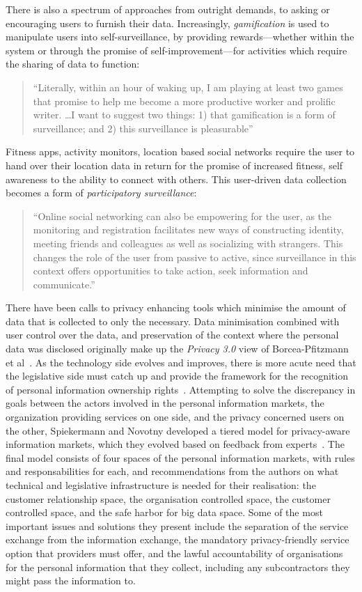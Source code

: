 \documentclass{IOS-Book-Article}     %
\begin{document}
There is also a spectrum of approaches from outright demands, 
to asking or encouraging users to furnish their data.
Increasingly, \emph{gamification} is used to manipulate
users into self-surveillance, by providing rewards---whether within the system
or through the promise of self-improvement---for activities which require the
sharing of data to function:
\begin{quote}``Literally, within an hour of waking up, I am playing at least 
two games that promise to help me become a more productive
worker and prolific writer. \ldots I want to suggest two things: 1) that gamification is a form of
surveillance; and 2) this surveillance is
pleasurable''~\cite{whitson2013gaming}\end{quote}
Fitness apps, activity monitors, location based social networks require the
user to hand over their location data in return for the promise of increased
fitness, self awareness to the ability to connect with others. 
This user-driven data collection becomes a form of \emph{participatory surveillance}:
\begin{quote}
``Online social networking can also be empowering for the user, as the monitoring and 
registration facilitates new ways of constructing identity, meeting friends and colleagues 
as well as socializing with strangers. This changes the role of the user from passive to 
active, since surveillance in this context offers opportunities to take action, seek 
information and communicate.''~\cite{albrechtslund2008online}
\end{quote} 

There have been calls to privacy enhancing tools which minimise the amount of data that is collected to only the necessary. Data minimisation combined with user control over the data, and preservation of the context where the personal data was disclosed originally make up the \emph{Privacy 3.0} view of Borcea-Pfitzmann et al~\cite{Borcea2011privacy}. 
As the technology side evolves and improves, there is more acute need that the legislative side must catch up and provide the framework for the recognition of personal information ownership rights~\cite{Schwartz2004property}. Attempting to solve the discrepancy in goals between the actors involved in the personal information markets, the organization providing services on one side, and the privacy concerned users on the other, Spiekermann and Novotny developed a tiered model for privacy-aware information markets, which they evolved based on feedback from experts~\cite{Spiekermann2014}. The final model consists of four spaces of the personal information markets, with rules and responsabilities for each, and recommendations from the authors on what technical and legislative infrastructure is needed for their realisation: the customer relationship space, the organisation controlled space, the customer controlled space, and the safe harbor for big data space. Some of the most important issues and solutions they present include the separation of the service exchange from the information exchange, the mandatory privacy-friendly service option that providers must offer, and the lawful accountability of organisations for the personal information that they collect, including any subcontractors they might pass the information to. 
\end{document}

